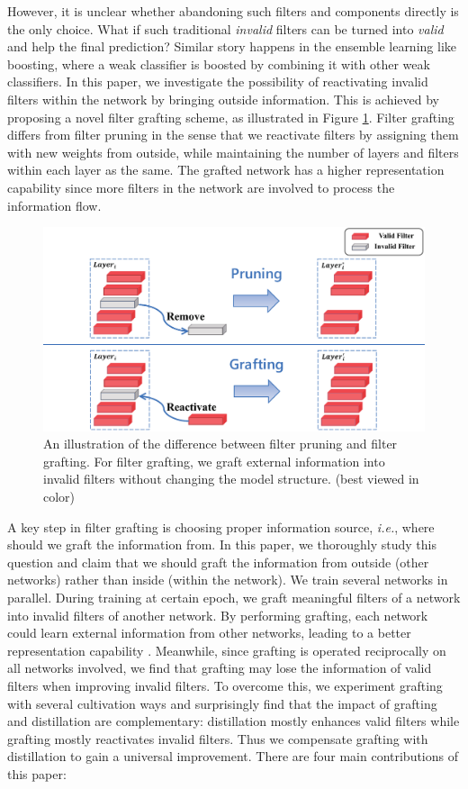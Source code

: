 \documentclass{article}
\begin{document}
However, it is unclear whether abandoning such filters and components directly is the only choice.
What if such traditional \emph{invalid} filters can be turned into \emph{valid} and help the final prediction?
Similar story happens in the ensemble learning like boosting, where a weak classifier is boosted by combining it with other weak classifiers.
In this paper, we investigate the possibility of reactivating invalid filters within the network by bringing outside information.
This is achieved by proposing a novel filter grafting scheme, as illustrated in Figure \ref{figure: pruning&grafting}.
Filter grafting differs from filter pruning in the sense that we reactivate filters by assigning them with new weights from outside, while maintaining the number of layers and filters within each layer as the same. The grafted network has a higher representation capability since more filters in the network are involved to process the information flow. 
\begin{figure}[t]
	\centering
	\includegraphics[width=15cm,]{fig/grafting_pruning.eps}
	\caption{An illustration of the difference between filter pruning and filter grafting. For filter grafting, we graft external information into invalid filters without changing the model structure. (best viewed in color)}
	\label{figure: pruning&grafting}
\end{figure}

A key step in filter grafting is choosing proper information source, \emph{i.e.}, where should we graft the information from. In this paper, we thoroughly study this question and claim that we should graft the information from outside (other networks) rather than inside (within the network). 
We train several networks in parallel. During training at certain epoch, we graft meaningful filters of a network into invalid filters of another network. By performing grafting, each network could learn external information from other networks, leading to a better representation capability \cite{meng2020filter}. Meanwhile, since grafting is operated reciprocally on all networks involved, we find that grafting may lose the information of valid filters when improving invalid filters. To overcome this, we experiment grafting with several cultivation ways and surprisingly find that the impact of grafting and distillation are complementary: distillation mostly enhances valid filters while grafting mostly reactivates invalid filters. Thus we compensate grafting with distillation to gain a universal improvement.
There are four main contributions of this paper:
\end{document}
